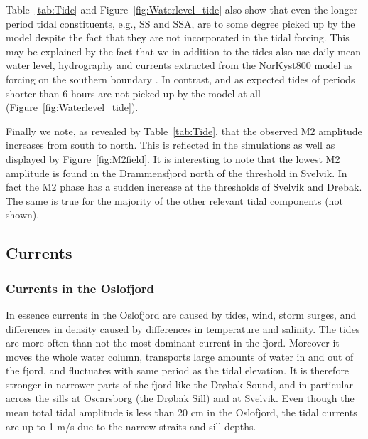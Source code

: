 Table~\ref{tab:Tide} and Figure~\ref{fig:Waterlevel_tide} also show that even the longer period tidal constituents, e.g., SS and SSA, are to some degree picked up by the model despite the fact that they are not incorporated in the tidal forcing. This may be explained by the fact that we in addition to the tides also use daily mean water level, hydrography and currents extracted from the NorKyst800 model as forcing on the southern boundary \citep{roed:etal:2016}. In contrast, and as expected tides of periods shorter than 6 hours are not picked up by the model at all (Figure~\ref{fig:Waterlevel_tide}).


Finally we note, as revealed by Table~\ref{tab:Tide}, that the observed M2 amplitude increases from south to north. This is reflected in the simulations as well as displayed by Figure~\ref{fig:M2field}. It is interesting to note that the lowest M2 amplitude is found in the Drammensfjord north of the threshold in Svelvik. In fact the M2 phase has a sudden increase at the thresholds of Svelvik and Dr{\o}bak. The same is true for the majority of the other relevant tidal components (not shown).


\clearpage
\subsection{Currents}
\label{subsec:curree}
\subsubsection{Currents in the Oslofjord}
\label{subsubsec:driving}
In essence currents in the Oslofjord are caused by tides, wind, storm surges, and differences in density caused by differences in temperature and salinity. The tides are more often than not the most dominant current in the fjord. Moreover it moves the whole water column, transports large amounts of water in and out of the fjord, and fluctuates with same period as the tidal elevation. It is therefore stronger in narrower parts of the fjord like the Dr{\o}bak Sound, and in particular across the sills at Oscarsborg (the Dr{\o}bak Sill) and at Svelvik. Even though the mean total tidal amplitude is less than 20 cm in the Oslofjord, the tidal currents are up to 1 m/s due to the narrow straits and sill depths.

